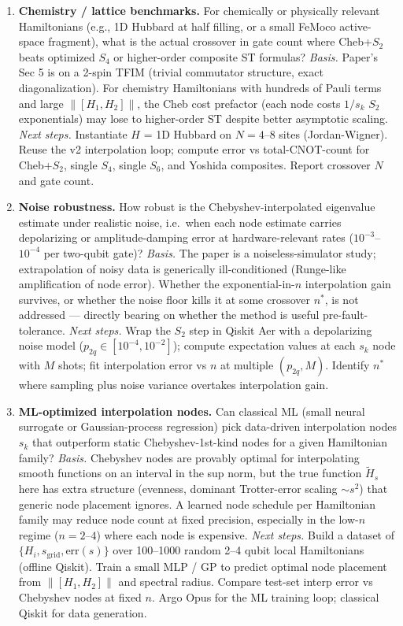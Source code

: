 \begin{enumerate}
\item \textbf{Chemistry / lattice benchmarks.}
For chemically or physically relevant Hamiltonians (e.g., 1D Hubbard at
half filling, or a small FeMoco active-space fragment), what is the
actual crossover in gate count where Cheb+$S_2$ beats optimized $S_4$
or higher-order composite ST formulas?
\emph{Basis.} Paper's Sec 5 is on a 2-spin TFIM (trivial commutator
structure, exact diagonalization). For chemistry Hamiltonians with
hundreds of Pauli terms and large $\|[H_1, H_2]\|$, the Cheb cost
prefactor (each node costs $1/s_k$ $S_2$ exponentials) may lose to
higher-order ST despite better asymptotic scaling.
\emph{Next steps.} Instantiate $H$ = 1D Hubbard on $N=4$--$8$ sites
(Jordan-Wigner). Reuse the v2 interpolation loop; compute error vs
total-CNOT-count for Cheb+$S_2$, single $S_4$, single $S_6$, and
Yoshida composites. Report crossover $N$ and gate count.

\item \textbf{Noise robustness.}
How robust is the Chebyshev-interpolated eigenvalue estimate under
realistic noise, i.e.\ when each node estimate carries depolarizing or
amplitude-damping error at hardware-relevant rates
($10^{-3}$--$10^{-4}$ per two-qubit gate)?
\emph{Basis.} The paper is a noiseless-simulator study; extrapolation
of noisy data is generically ill-conditioned (Runge-like amplification
of node error). Whether the exponential-in-$n$ interpolation gain
survives, or whether the noise floor kills it at some crossover $n^*$,
is not addressed --- directly bearing on whether the method is useful
pre-fault-tolerance.
\emph{Next steps.} Wrap the $S_2$ step in Qiskit Aer with a
depolarizing noise model ($p_{2q}\!\in\![10^{-4},10^{-2}]$); compute
expectation values at each $s_k$ node with $M$ shots; fit interpolation
error vs $n$ at multiple $(p_{2q}, M)$. Identify $n^*$ where sampling
plus noise variance overtakes interpolation gain.

\item \textbf{ML-optimized interpolation nodes.}
Can classical ML (small neural surrogate or Gaussian-process
regression) pick data-driven interpolation nodes $s_k$ that outperform
static Chebyshev-1st-kind nodes for a given Hamiltonian family?
\emph{Basis.} Chebyshev nodes are provably optimal for interpolating
smooth functions on an interval in the sup norm, but the true function
$\tilde H_s$ here has extra structure (evenness, dominant Trotter-error
scaling $\sim s^2$) that generic node placement ignores. A learned node
schedule per Hamiltonian family may reduce node count at fixed
precision, especially in the low-$n$ regime ($n=2$--$4$) where each
node is expensive.
\emph{Next steps.} Build a dataset of $\{H_i, s_{\mathrm{grid}},
\mathrm{err}(s)\}$ over 100--1000 random 2--4 qubit local Hamiltonians
(offline Qiskit). Train a small MLP / GP to predict optimal node
placement from $\|[H_1,H_2]\|$ and spectral radius. Compare test-set
interp error vs Chebyshev nodes at fixed $n$. Argo Opus for the ML
training loop; classical Qiskit for data generation.

\end{enumerate}
